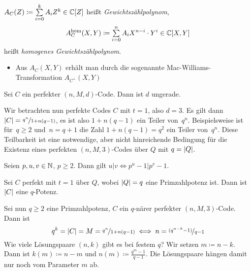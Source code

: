 \documentclass{cheat-sheet}
\newcommand{\homogen}{\text{hom}} %
\newcommand{\divides}{|} %
\begin{document}
\begin{defn}
  $A_C(Z) \coloneqq \sum_{i=0}^k A_i Z^k \in \C[Z]$ heißt \emph{Gewichtszählpolynom},
  \[ A_C^\homogen(X, Y) \coloneqq \sum_{i=0}^n A_i X^{n-i} \cdot Y^i \in \C[X, Y] \]
  heißt \emph{homogenes Gewichtszählpolynom}.
\end{defn}

\begin{bem}
  \inlineitem{$A_C(Z) = A_C^\homogen(1, Z)$} \quad
  \inlineitem{$A_C^\homogen(X, Y) = X^n \cdot A_C(\tfrac{Y}{X})$}
  \begin{itemize}
    \item Aus $A_C(X, Y)$ erhält man durch die sogenannte Mac-Williams-Transformation $A_{C^\perp}(X, Y)$
  \end{itemize}
\end{bem}



\begin{lem}
  Sei $C$ ein perfekter $(n, M, d)$-Code. %
  Dann ist $d$ ungerade.
\end{lem}

\begin{bem}
  Wir betrachten nun perfekte Codes $C$ mit $t=1$, also $d=3$.
  Es gilt dann $\lvert C\rvert = \nicefrac{q^n}{1 + n(q-1)}$, es ist also $1+n(q-1)$ ein Teiler von~$q^n$.
  Beispielsweise ist für~$q \geq 2$ und~$n = q+1$ die Zahl $1 + n(q-1) = q^2$ ein Teiler von~$q^n$.
  Diese Teilbarkeit ist eine notwendige, aber nicht hinreichende Bedingung für die Existenz eines perfekten $(n, M, 3)$-Codes über $Q$ mit $q = \lvert Q\rvert$.
\end{bem}

\begin{lem}
  Seien $p, u, v \in \mathbb{N}$, $p \geq 2$. Dann gilt $u \divides v \iff p^u - 1 \divides p^v - 1$.
\end{lem}

\begin{prop}
  Sei $C$ perfekt mit $t=1$ über $Q$, wobei $\lvert Q\rvert = q$ eine Primzahlpotenz ist.
  Dann ist $\lvert C\rvert$ eine $q$-Potenz.
\end{prop}

\begin{bem}
  Sei nun $q \geq 2$ eine Primzahlpotenz, $C$ ein $q$-närer perfekter $(n, M, 3)$-Code.
  Dann ist
  \[ q^k = \lvert C\rvert = M = \nicefrac{q^n}{1 + n(q-1)} \iff n = \nicefrac{(q^{n-k} - 1)}{q - 1} \]
  Wie viele Lösungspaare $(n, k)$ gibt es bei festem $q$?
  Wir setzen $m \coloneqq n - k$.
  Dann ist $k(m) \coloneqq n - m$ und $n(m) \coloneqq \tfrac{q^m - 1}{q - 1}$.
  Die Lösungspaare hängen damit nur noch vom Parameter $m$ ab.
\end{bem}
\end{document}
